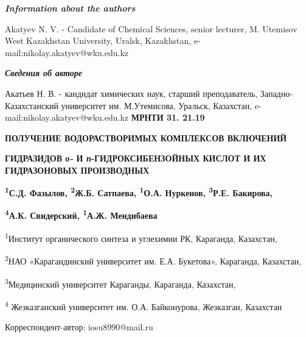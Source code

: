 \emph{{\bfseries Information about the authors}}

Akatyev N. V. - Candidate of Chemical Sciences, senior lecturer, M.
Utemisov West Kazakhstan University, Uralsk, Kazakhstan,
e-mail:nikolay.akatyev@wku.edu.kz

\emph{{\bfseries Сведения об авторе}}

Акатьев Н. В. - кандидат химических наук, старший преподаватель,
Западно-Казахстанский университет им. М.Утемисова, Уральск, Казахстан,
e-mail:nikolay.akatyev@wku.edu.kz\newpage
{\bfseries МРНТИ 31. 21.19}

{\bfseries ПОЛУЧЕНИЕ ВОДОРАСТВОРИМЫХ КОМПЛЕКСОВ ВКЛЮЧЕНИЙ}

{\bfseries ГИДРАЗИДОВ \emph{о-} И \emph{п}-ГИДРОКСИБЕНЗОЙНЫХ КИСЛОТ И ИХ
ГИДРАЗОНОВЫХ ПРОИЗВОДНЫХ}

{\bfseries \textsuperscript{1}С.Д. Фазылов, \textsuperscript{2}Ж.Б.
Сатпаева, \textsuperscript{1}О.А. Нуркенов, \textsuperscript{3}Р.Е.
Бакирова,}

{\bfseries \textsuperscript{4}А.К. Свидерский, \textsuperscript{1}А.Ж.
Мендибаева}

\textsuperscript{1}Институт органического синтеза и углехимии РК,
Караганда, Казахстан,

\textsuperscript{2}НАО «Карагандинский университет им. Е.А. Букетова»,
Караганда, Казахстан,

\textsuperscript{3}Медицинский университет Караганды, Караганда,
Казахстан,

\textsuperscript{4} Жезказганский университет им. О.А. Байконурова,
Жезказган, Казахстан

Корреспондент-автор: iosu8990@mail.ru

